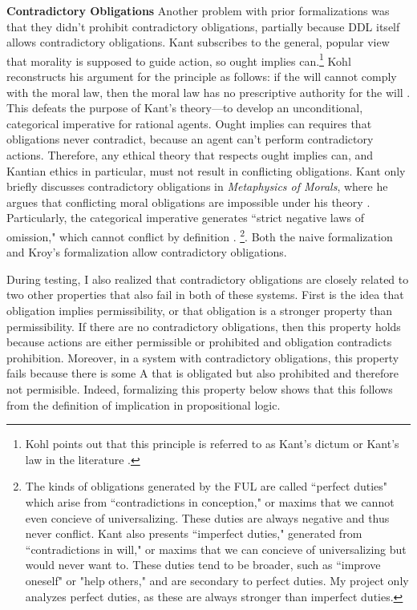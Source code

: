 \begin{isabellebody}
\begin{isamarkuptext}
\textbf{Contradictory Obligations} Another problem with prior formalizations was that they didn't
prohibit contradictory obligations, partially because DDL itself allows contradictory obligations. 
Kant subscribes to the general, popular view that morality is supposed to guide action, so ought implies 
can.\footnote{Kohl points out that this principle is referred to as 
Kant's dictum or Kant's law in the literature \cite[footnote 1]{kohl}.} Kohl reconstructs his argument for the principle as 
follows: if the will cannot comply with the moral law, then the moral law has no prescriptive authority 
for the will \cite[703-4]{kohl}. This defeats the purpose of Kant's theory—to develop an unconditional, categorical imperative 
for rational agents. Ought implies can requires that obligations never contradict, because an agent 
can't perform contradictory actions. Therefore, any ethical theory that respects ought implies can, 
and Kantian ethics in particular, must not result in conflicting obligations. 
Kant only briefly discusses contradictory obligations in \emph{Metaphysics of Morals}, where he argues that 
conflicting moral obligations are impossible under his theory \cite[V224]{metaphysicsintro}. Particularly, the categorical imperative generates 
``strict negative laws of omission," which cannot conflict by definition \cite[45]{timmerman}. \footnote{The 
kinds of obligations generated by the FUL are called ``perfect duties" which arise from ``contradictions 
in conception," or maxims that we cannot even concieve of universalizing. These duties are always negative 
and thus never conflict. Kant also presents ``imperfect duties," generated from ``contradictions in will,"
or maxims that we can concieve of universalizing but would never want to. These duties tend to be broader, 
such as ``improve oneself" or "help others," and are secondary to perfect duties. My project only analyzes 
perfect duties, as these are always stronger than imperfect duties.}. Both the naive formalization and 
Kroy's formalization allow contradictory obligations. 

During testing, I also realized that contradictory obligations are closely related to two other properties
that also fail in both of these systems. First is the idea that obligation implies permissibility, or 
that obligation is a stronger property than permissibility. If there are no contradictory obligations, 
then this property holds because actions are either permissible or prohibited and obligation contradicts
prohibition. Moreover, in a system with contradictory obligations, this property fails because there is some
A that is obligated but also prohibited and therefore not permisible. Indeed, formalizing this property below shows 
that this follows from the definition of implication in propositional logic.


\end{isamarkuptext}
\end{isabellebody}
